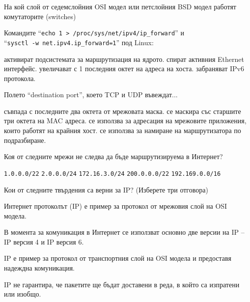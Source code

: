 \begin{questions}
  \question[6] На кой слой от седемслойния OSI модел или петслойния BSD модел
  работят комутаторите (\foreignlanguage{english}{switches})
  \begin{oneparchoices}
  \end{oneparchoices}

  \question[6] Командите "`\texttt{echo 1 > /proc/sys/net/ipv4/ip\_forward}"' и \\
  "`\texttt{sysctl -w net.ipv4.ip\_forward=1}"' под Linux:
  \begin{choices}
    \CorrectChoice активират подсистемата за маршрутизация на ядрото.
    \choice спират активния Ethernet интерфейс.
    \choice увеличават с 1 последния октет на адреса на хоста.
    \choice забраняват IPv6 протокола.
  \end{choices}

  \question[6] Полето "`\foreignlanguage{english}{destination port}"', което TCP
  и UDP въвеждат...
  \begin{choices}
    \choice съвпада с последните два октета от мрежовата маска.
    \choice се маскира със старшите три октета на MAC адреса.
    \CorrectChoice се използва за адресация на мрежовите приложения, които
    работят на крайния хост.
    \choice се използва за намиране на маршрутизатора по подразбиране.
  \end{choices}

  \question[6] Коя от следните мрежи не следва да бъде маршрутизируема в Интернет?
  \begin{choices}
    \choice \texttt{1.0.0.0/22}
    \choice \texttt{2.0.0.0/24}
    \CorrectChoice \texttt{172.16.3.0/24}
    \choice \texttt{200.0.0.0/22}
    \choice \texttt{192.169.0.0/16}
  \end{choices}

  \question[6] Кои от следните твърдения са верни за IP? (Изберете три отговора)
  \begin{choices}
    \CorrectChoice Интернет протоколът (IP) е пример за протокол от мрежовия
    слой на OSI модела.

    \CorrectChoice В момента за комуникация в Интернет се използват основно две
    версии на IP – IP версия 4 и IP версия 6.

    \choice IP е пример за протокол от транспортния слой на OSI модела и
    предоставя надеждна комуникация.

    \CorrectChoice IP не гарантира, че пакетите ще бъдат доставени в реда, в
    който са изпратени или изобщо.
  \end{choices}


\end{questions}
